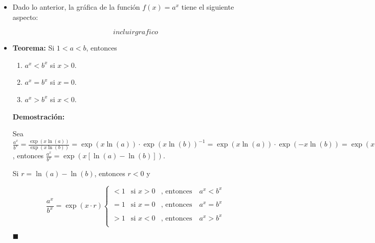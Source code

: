 \documentclass[pts12]{article}
\numberwithin{equation}{section}
\newcommand{\Col}{\color{ProcessBlue}}
\newcommand{\limit}[2]{\lim_{#1\to #2}}
\newcommand{\limf}[1]{\lim_{#1\to\infty}}
\begin{document}
\begin{itemize}
\begin{enumerate}
\begin{enumerate}
\item[\textbf{Caso 2.}]  $a=1$
\begin{enumerate}
\item $\limf{x}a^x=\limf{x}\exp(x\ln(a))=\limf{x}\exp(x\cdot 0)=1$.
\item $\limit{x}{-\infty}a^x=\limit{x}{-\infty}\exp(x\ln(a))=\limit{x}{-\infty}\exp(x\cdot 0)=1$.
\end{enumerate} 

\item[\textbf{Caso 3.}]  $1<a$
\begin{enumerate}
\item $\limf{x}a^x=\limf{x}\exp(x\ln(a))=\infty$.
\item $\limit{x}{-\infty}a^x=\limit{x}{-\infty}\exp(x\ln(a))=0$.
\end{enumerate} 

\end{enumerate}

\end{enumerate}

\item[\Col •] Dado lo anterior, la gráfica de la función $f(x)=a^x$ tiene el siguiente aspecto:

$$ incluir grafico $$

\item[\Col •] \textbf{Teorema:} Si $1<a<b$, entonces 

\begin{enumerate}
\item[a)] $a^x<b^x$ si $x>0$.
\item[b)] $a^x=b^x$ si $x=0$.
\item[c)] $a^x>b^x$ si $x<0$.
\end{enumerate}

\textbf{Demostración:} 

Sea $\frac{a^x}{b^x}=\frac{\exp(x\ln(a))}{\exp(x\ln(b))}=\exp(x\ln(a))\cdot\exp(x\ln(b))^{-1}=\exp(x\ln(a))\cdot\exp(-x\ln(b))=\exp(x\ln(a)-x\ln(b))=\exp(x(\ln(a)-\ln(b)))$, entonces $\frac{a^x}{b^x}=\exp(x[\ln(a)-\ln(b)])$. 

Si $r=\ln(a)-\ln(b)$, entonces $r<0$ y 

$$\frac{a^x}{b^x}=\exp(x\cdot r)
\left\{
 \begin{array}{lll}
  <1  & \mbox{si } x>0 & \mbox{, entonces} \quad a^x<b^x \\
  \\ =1 & \mbox{si } x=0 & \mbox{, entonces} \quad a^x=b^x \\
  \\ >1 & \mbox{si } x<0 & \mbox{, entonces} \quad a^x>b^x \\
 \end{array}
\right.$$

\begin{flushright}
$\blacksquare$
\end{flushright} 

\end{itemize}
\end{document}
